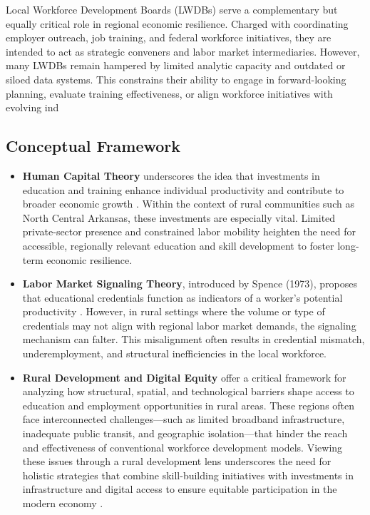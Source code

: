 \documentclass[12pt]{llncs}
\begin{document}
Local Workforce Development Boards (LWDBs) serve a complementary but equally critical role in regional economic resilience. Charged with coordinating employer outreach, job training, and federal workforce initiatives, they are intended to act as strategic conveners and labor market intermediaries\cite{arkansas_code_1543711}. However, many LWDBs remain hampered by limited analytic capacity and outdated or siloed data systems\cite{results4america_dataaccess_2024,naswa_changingworkforce_2018}. This constrains their ability to engage in forward-looking planning, evaluate training effectiveness, or align workforce initiatives with evolving ind

 \subsection{Conceptual Framework}
 
\begin{itemize}
  \item \textbf{Human Capital Theory} underscores the idea that investments in education and training enhance individual productivity and contribute to broader economic growth \cite{becker_humancapital_1975, nickerson_functionalist_2024}. Within the context of rural communities such as North Central Arkansas, these investments are especially vital. Limited private-sector presence and constrained labor mobility heighten the need for accessible, regionally relevant education and skill development to foster long-term economic resilience.
  
  \item \textbf{Labor Market Signaling Theory}, introduced by Spence (1973), proposes that educational credentials function as indicators of a worker’s potential productivity \cite{linde_signalling_2025}. However, in rural settings where the volume or type of credentials may not align with regional labor market demands, the signaling mechanism can falter. This misalignment often results in credential mismatch, underemployment, and structural inefficiencies in the local workforce.
  
  \item \textbf{Rural Development and Digital Equity} offer a critical framework for analyzing how structural, spatial, and technological barriers shape access to education and employment opportunities in rural areas. These regions often face interconnected challenges—such as limited broadband infrastructure, inadequate public transit, and geographic isolation—that hinder the reach and effectiveness of conventional workforce development models. Viewing these issues through a rural development lens underscores the need for holistic strategies that combine skill-building initiatives with investments in infrastructure and digital access to ensure equitable participation in the modern economy \cite{WHITACRE20141011,urban2023,NTIA2023}.
  \end{itemize}
\end{document}
